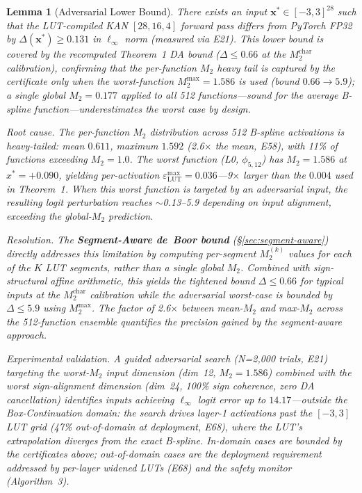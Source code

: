 \documentclass[journal,onecolumn]{IEEEtran}
\newtheorem{lemma}{Lemma}
\begin{document}
\setcounter{lemma}{5}
\begin{lemma}[Adversarial Lower Bound]
There exists an input $\mathbf{x}^* \in [-3,3]^{28}$ such that the
LUT-compiled KAN $[28,16,4]$ forward pass differs from PyTorch FP32
by $\Delta(\mathbf{x}^*) \geq 0.131$ in $\ell_\infty$ norm (measured
via E21). This lower bound is covered by the recomputed Theorem~1 DA
bound ($\Delta \leq 0.66$ at the $M_2^{\text{char}}$ calibration),
confirming that the per-function $M_2$ heavy tail is captured by the
certificate only when the worst-function $M_2^{\max} = 1.586$ is used
(bound $0.66 \to 5.9$); a single global $M_2 = 0.177$ applied to all
512 functions---sound for the \textit{average} B-spline
function---underestimates the worst case by design.

\vspace{2pt}
\noindent\textit{Root cause.} The per-function $M_2$ distribution
across 512 B-spline activations is heavy-tailed: mean $0.611$, maximum
$1.592$ (2.6$\times$ the mean, E58), with 11\% of functions exceeding
$M_2 = 1.0$. The worst function (L0, $\phi_{5,12}$) has
$M_2 = 1.586$ at $x^* = +0.090$, yielding per-activation
$\varepsilon_{\text{LUT}}^{\max} = 0.036$---9$\times$ larger than the
$0.004$ used in Theorem~1. When this worst function is targeted by an
adversarial input, the resulting logit perturbation reaches
$\sim$0.13--5.9 depending on input alignment, exceeding the
global-$M_2$ prediction.

\vspace{2pt}
\noindent\textit{Resolution.} The \textbf{Segment-Aware de~Boor bound}
(\S\ref{sec:segment-aware}) directly addresses this limitation by
computing per-segment $M_2^{(k)}$ values for each of the $K$ LUT
segments, rather than a single global $M_2$. Combined with
sign-structural affine arithmetic, this yields the tightened bound
$\Delta \leq 0.66$ for typical inputs at the $M_2^{\text{char}}$
calibration while the adversarial worst-case is bounded by
$\Delta \leq 5.9$ using $M_2^{\max}$. The factor of 2.6$\times$
between mean-$M_2$ and max-$M_2$ across the 512-function ensemble
quantifies the precision gained by the segment-aware approach.

\vspace{2pt}
\noindent\textit{Experimental validation.} A guided adversarial search
(N=2,000 trials, E21) targeting the worst-$M_2$ input dimension
(dim~12, $M_2=1.586$) combined with the worst sign-alignment
dimension (dim~24, 100\% sign coherence, zero DA cancellation)
identifies inputs achieving $\ell_\infty$ logit error up to
$14.17$---outside the Box-Continuation domain: the search drives
layer-1 activations past the $[-3,3]$ LUT grid (47\% out-of-domain at
deployment, E68), where the LUT's extrapolation diverges from the
exact B-spline. In-domain cases are bounded by the certificates above;
out-of-domain cases are the deployment requirement addressed by
per-layer widened LUTs (E68) and the safety monitor (Algorithm~3).
\end{lemma}
\end{document}
